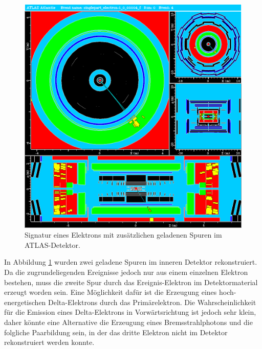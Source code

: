 \documentclass[11pt, a4paper]{article}
\numberwithin{equation}{section}
\begin{document}
\clearpage
\begin{figure}[htbp]
	\centering
	\includegraphics[width=1.0\textwidth]{./data/atlantis/singlepart_events_new/electron/twopart.png}
	\caption{Signatur eines Elektrons mit zusätzlichen geladenen Spuren im ATLAS-Detektor.}
	\label{fig:electron-twopart}
\end{figure}
\vfill
\noindent
In Abbildung \ref{fig:electron-twopart} wurden zwei geladene Spuren im inneren Detektor rekonstruiert.
Da die zugrundeliegenden Ereignisse jedoch nur aus einem einzelnen Elektron bestehen, muss die zweite Spur durch das Ereignis-Elektron im Detektormaterial erzeugt worden sein.
Eine Möglichkeit dafür ist die Erzeugung eines hoch-energetischen Delta-Elektrons durch das Primärelektron.
Die Wahrscheinlichkeit für die Emission eines Delta-Elektrons in Vorwärtsrichtung ist jedoch sehr klein, daher könnte eine Alternative die Erzeugung eines Bremsstrahlphotons und die folgliche Paarbildung sein, in der das dritte Elektron nicht im Detektor rekonstruiert werden konnte.
\vfill

\clearpage
\end{document}
